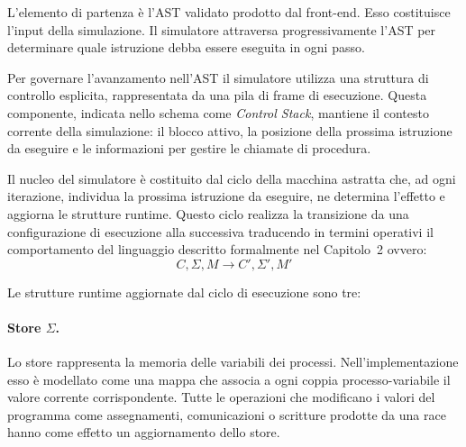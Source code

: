 \begin{center}
\end{center}

L’elemento di partenza è l’AST validato prodotto dal front-end. Esso costituisce l’input della simulazione. Il simulatore attraversa progressivamente l’AST per determinare quale istruzione debba essere eseguita in ogni passo.

Per governare l’avanzamento nell’AST il simulatore utilizza una struttura di controllo esplicita, rappresentata da una pila di frame di esecuzione. Questa componente, indicata nello schema come \textit{Control Stack}, mantiene il contesto corrente della simulazione: il blocco attivo, la posizione della prossima istruzione da eseguire e le informazioni per gestire le chiamate di procedura.

Il nucleo del simulatore è costituito dal ciclo della macchina astratta che, ad ogni iterazione, individua la prossima istruzione da eseguire, ne determina l’effetto e aggiorna le strutture runtime. Questo ciclo realizza la transizione da una configurazione di esecuzione alla successiva traducendo in termini operativi il comportamento del linguaggio descritto formalmente nel Capitolo~2 ovvero:
\[
C, \Sigma, M \rightarrow C', \Sigma', M'
\]


Le strutture runtime aggiornate dal ciclo di esecuzione sono tre:

\paragraph{Store $\Sigma$.}
Lo store rappresenta la memoria delle variabili dei processi. Nell’implementazione esso è modellato come una mappa che associa a ogni coppia processo-variabile il valore corrente corrispondente. Tutte le operazioni che modificano i valori del programma come assegnamenti, comunicazioni o scritture prodotte da una race hanno come effetto un aggiornamento dello store.

